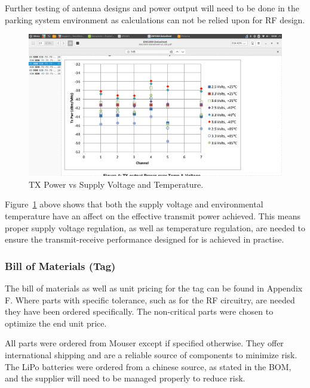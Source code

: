 \newpage
{}
Further testing of antenna designs and power output will need to be done in the parking system environment as calculations can not be relied upon for RF design.

\begin{figure}[H]
\begin{center}
\includegraphics[scale=0.4,trim={7cm 1.5cm 8cm 5.5cm},clip]{data/tx_power.png}
\caption{TX Power vs Supply Voltage and Temperature.\cite{DW-data}}
\label{fig:tx-power}
\end{center}
\end{figure}

Figure~\ref{fig:tx-power} above shows that both the supply voltage and environmental temperature have an affect on the effective transmit power achieved. This means proper supply voltage regulation, as well as temperature regulation, are needed to ensure the transmit-receive performance designed for is achieved in practise.

\newpage
\subsubsection{Bill of Materials (Tag)}
The bill of materials as well as unit pricing for the tag can be found in Appendix F. Where parts with specific tolerance, such as for the RF circuitry, are needed they have been ordered specifically. The non-critical parts were chosen to optimize the end unit price. 

All parts were ordered from Mouser except if specified otherwise. They offer international shipping and are a reliable source of components to minimize risk. The LiPo batteries were ordered from a chinese source, as stated in the BOM, and the supplier will need to be managed properly to reduce risk.

